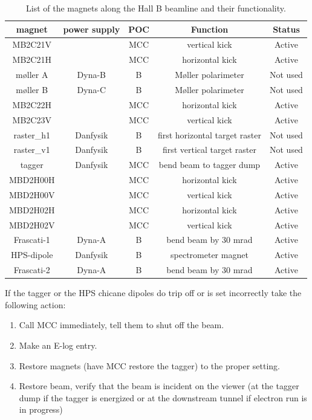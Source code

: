 \documentclass[12pt]{article}
\begin{document}
\begin{table}[tbhp]
\vspace{0.3cm}
{\centering \begin{tabular}{|c|c|c|c|c|}
\hline 
magnet&
power supply&
POC&
Function&
Status\\
\hline 
\hline 
MB2C21V&
&
MCC&
vertical kick&
Active\\
\hline 
MB2C21H&
&
MCC&
horizontal kick&
Active\\
\hline 
m{\o}ller A&
Dyna-B&
B&
M{\o}ller polarimeter&
Not used\\
\hline 
m{\o}ller B&
Dyna-C&
B&
M{\o}ller polarimeter&
Not used\\
\hline 
MB2C22H&
&
MCC&
horizontal kick&
Active\\
\hline 
MB2C23V&
&
MCC&
vertical kick&
Active\\
\hline 
raster\_h1&
Danfysik&
B&
first horizontal target raster&
Not used\\
\hline 
raster\_v1&
Danfysik&
B&
first vertical target raster&
Not used\\
\hline 
tagger&
Danfysik&
MCC&
bend beam to tagger dump&
Active\\
\hline 
MBD2H00H&
&
MCC&
horizontal kick&
Active\\
\hline 
MBD2H00V&
&
MCC&
vertical kick&
Active\\
\hline 
MBD2H02H&
&
MCC&
horizontal kick&
Active\\
\hline 
MBD2H02V&
&
MCC&
vertical kick&
Active\\
\hline 
Frascati-1&
Dyna-A&
B&
bend beam by 30 mrad&
Active\\
\hline 
HPS-dipole&
Danfysik&
B&
spectrometer magnet&
Active\\
\hline 
Frascati-2&
Dyna-A&
B&
bend beam by 30 mrad&
Active\\
\hline 
\end{tabular}\par}
\vspace{0.3cm}


\caption{List of the magnets along the Hall B beamline and their functionality.\label{magnets}}
\end{table} 

If the tagger or the HPS chicane dipoles do trip off or is set incorrectly take the following action:

\begin{enumerate}
\item Call MCC immediately, tell them to shut off the beam.
\item Make an E-log entry.
\item Restore magnets (have MCC restore the tagger) to the proper setting.
\item Restore beam, verify that the beam is incident on the viewer (at the tagger dump if the tagger is energized or at the downstream tunnel if electron run is in progress)
\end{enumerate}
\end{document}
